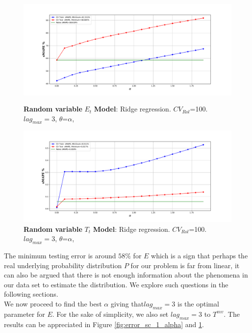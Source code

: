 \begin{figure}[h!]
	\centering
	\begin{minipage}[b]{\textwidth}
		\includegraphics[width=\textwidth]{data/error_sc_1_alpha.pdf}
		\caption{\textbf{Random variable} $E_{t}$ \textbf{Model}: Ridge regression. \textbf{$CV_{Rol}$}=100. $lag_{max}=3$, $\theta$=$\alpha$, }
		\label{fig:error_sc_1_alpha}
	\end{minipage}
	\hfill
	\begin{minipage}[b]{\textwidth}
		\includegraphics[width=\textwidth]{data/trend_sc_1_alpha.pdf}
		\caption{\textbf{Random variable} $T_{t}$ \textbf{Model}: Ridge regression. \textbf{$CV_{Rol}$}=100. $lag_{max}=3$, $\theta$=$\alpha$, }  %
		\label{fig:trend_sc_1_alpha}
	\end{minipage}
\end{figure}



The minimum testing error is around $58\%$ for  $E$ which is a sign that perhaps the real underlying probability distribution $P$ for our problem is far from linear, it can also be argued that there is not enough information about the phenomena in our data set to estimate the distribution. We explore such questions in the following sections.\\




We now proceed to find the best $\alpha$ giving that$lag_{max}=3$ is the optimal parameter for $E$. For the sake of simplicity, we also set $lag_{max}=3$ to $T^{mv}$. The results can be appreciated in Figure \ref{fig:error_sc_1_alpha} and \ref{fig:trend_sc_1_alpha}.\\ 

